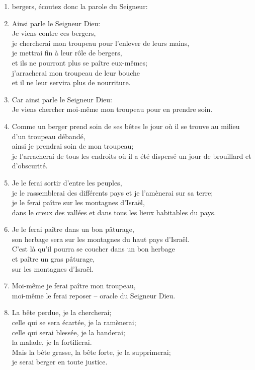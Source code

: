 \begin{enumerate}[leftmargin=\psleftmargin, labelsep = \pslabelsep, label={\arabic*}, font=\color{\pscolor}\small\textsuperscript, parsep=0em, itemsep=0em, topsep=0em ]
    \item bergers, écoutez donc la parole du Seigneur:
    \item Ainsi parle le Seigneur Dieu: \\ Je viens contre ces bergers, \\ je chercherai mon troupeau pour l’enlever de leurs mains, \\ je mettrai fin à leur rôle de bergers, \\
          et ils ne pourront plus se paître eux-mêmes; \\ j’arracherai mon troupeau de leur bouche \\
          et il ne leur servira plus de nourriture. \newpage
    \item Car ainsi parle le Seigneur Dieu: \\ Je viens chercher moi-même mon troupeau pour en prendre soin.
    \item Comme un berger prend soin de ses bêtes le jour où il se trouve au milieu d’un troupeau débandé, \\ ainsi je prendrai soin de mon troupeau; \\ je l’arracherai de tous les endroits où il a été dispersé un jour de brouillard et d’obscurité.
    \item Je le ferai sortir d’entre les peuples, \\ je le rassemblerai des différents pays et je l’amènerai sur sa terre; \\ je le ferai paître sur les montagnes d’Israël, \\ dans le creux des vallées et dans tous les lieux habitables du pays.
    \item Je le ferai paître dans un bon pâturage, \\ son herbage sera sur les montagnes du haut pays d’Israël.\\ C’est là qu’il pourra se coucher dans un bon herbage \\ et paître un gras pâturage, \\ sur les montagnes d’Israël.
    \item Moi-même je ferai paître mon troupeau,\\  moi-même le ferai reposer – oracle du Seigneur Dieu.
    \item La bête perdue, je la chercherai; \\ celle qui se sera écartée, je la ramènerai; \\ celle qui serai blessée, je la banderai; \\ la malade, je la fortifierai. \\
    Mais la bête grasse, la bête forte, je la supprimerai; \\ je serai berger en toute justice.\newpage

\end{enumerate}
